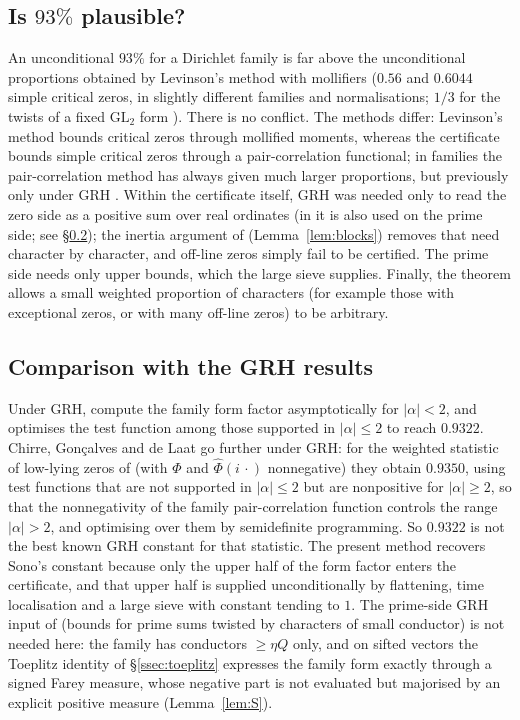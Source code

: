 \documentclass[11pt]{amsart}
\theoremstyle{definition}
\theoremstyle{remark}
\numberwithin{equation}{section}
\begin{document}
\subsection{Is $93\%$ plausible?}
An unconditional $93\%$ for a Dirichlet family is far above the unconditional proportions obtained by Levinson's method with mollifiers \cite{CIS13,Sono25} ($0.56$ and $0.6044$ simple critical zeros, in slightly different families and normalisations; $1/3$ for the twists of a fixed $\mathrm{GL}_2$ form \cite{CKLT26}). There is no conflict. The methods differ: Levinson's method bounds critical zeros through mollified moments, whereas the certificate bounds simple critical zeros through a pair-correlation functional; in families the pair-correlation method has always given much larger proportions, but previously only under GRH \cite{Ozl96,CLLR,Sono16,CGdL}. Within the certificate itself, GRH was needed only to read the zero side as a positive sum over real ordinates (in \cite{CLLR} it is also used on the prime side; see \S\ref{sec:grhcomp}); the inertia argument of \cite{AF26} (Lemma~\ref{lem:blocks}) removes that need character by character, and off-line zeros simply fail to be certified. The prime side needs only upper bounds, which the large sieve supplies. Finally, the theorem allows a small weighted proportion of characters (for example those with exceptional zeros, or with many off-line zeros) to be arbitrary.

\subsection{Comparison with the GRH results}\label{sec:grhcomp}
Under GRH, \cite{CLLR} compute the family form factor asymptotically for $|\alpha|<2$, and \cite{Sono16} optimises the test function among those supported in $|\alpha|\le2$ to reach $0.9322$. Chirre, Gon\c calves and de Laat \cite[Theorem~5]{CGdL} go further under GRH: for the weighted statistic of low-lying zeros of \cite{CLLR,Sono16} (with $\Phi$ and $\widehat\Phi(i\,\cdot)$ nonnegative) they obtain $0.9350$, using test functions that are not supported in $|\alpha|\le2$ but are nonpositive for $|\alpha|\ge2$, so that the nonnegativity of the family pair-correlation function controls the range $|\alpha|>2$, and optimising over them by semidefinite programming. So $0.9322$ is not the best known GRH constant for that statistic. The present method recovers Sono's constant because only the upper half of the form factor enters the certificate, and that upper half is supplied unconditionally by flattening, time localisation and a large sieve with constant tending to $1$. The prime-side GRH input of \cite{CLLR} (bounds for prime sums twisted by characters of small conductor) is not needed here: the family has conductors $\ge\eta Q$ only, and on sifted vectors the Toeplitz identity of \S\ref{ssec:toeplitz} expresses the family form exactly through a signed Farey measure, whose negative part is not evaluated but majorised by an explicit positive measure (Lemma~\ref{lem:S}).
\end{document}
